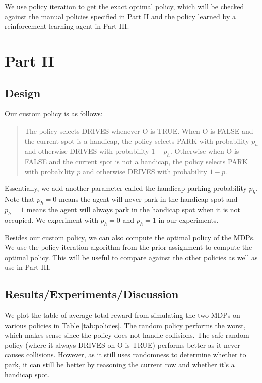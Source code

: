 \documentclass[paper=a4, fontsize=11pt]{scrartcl}
\begin{document}
We use policy iteration to get the exact optimal policy, which will be checked against the manual policies specified in Part II and the policy learned by a reinforcement learning agent in Part III.

\section{Part II}

\subsection{Design}

Our custom policy is as follows:

\blockquote{The policy selects DRIVES whenever O is TRUE. When O is FALSE and the current spot is a handicap, the policy selects PARK with probability $p_h$ and otherwise DRIVES with probability $1-p_h$. Otherwise when O is FALSE and the current spot is not a handicap, the policy selects PARK with probability $p$ and otherwise DRIVES with probability $1-p$.}

Essentially, we add another parameter called the handicap parking probability $p_h$. Note that $p_h=0$ means the agent will never park in the handicap spot and $p_h=1$ means the agent will always park in the handicap spot when it is not occupied. We experiment with $p_h=0$ and $p_h=1$ in our experiments.

Besides our custom policy, we can also compute the optimal policy of the MDPs. We use the policy iteration algorithm from the prior assignment to compute the optimal policy. This will be useful to compare against the other policies as well as use in Part III.

\subsection{Results/Experiments/Discussion}

We plot the table of average total reward from simulating the two MDPs on various policies in Table \ref{tab:policies}. The random policy performs the worst, which makes sense since the policy does not handle collisions. The safe random policy (where it always DRIVES on O is TRUE) performs better as it never causes collisions. However, as it still uses randomness to determine whether to park, it can still be better by reasoning the current row and whether it's a handicap spot.
\end{document}
